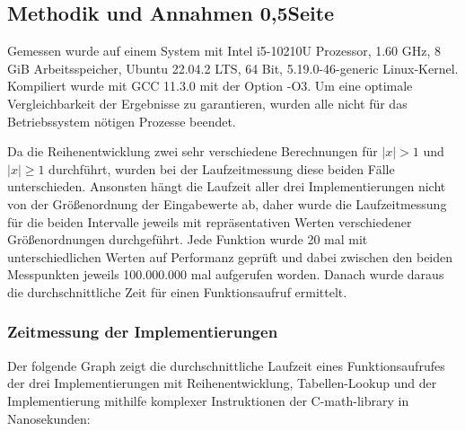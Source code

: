\documentclass[course=erap] {aspdoc}
\begin{document}
     \subsection{Methodik und Annahmen 0,5Seite}
 
     Gemessen wurde auf einem System mit Intel i5-10210U Prozessor, 1.60 GHz, 8 GiB Arbeitsspeicher, Ubuntu 22.04.2 LTS, 64 Bit, 5.19.0-46-generic Linux-Kernel.
     Kompiliert wurde mit GCC 11.3.0 mit der Option -O3. Um eine optimale Vergleichbarkeit der Ergebnisse zu garantieren, wurden alle nicht für das Betriebssystem nötigen Prozesse beendet. 
 
     Da die Reihenentwicklung zwei sehr verschiedene Berechnungen für $|x|>1$ und $|x|\geq 1$ durchführt, wurden bei der Laufzeitmessung diese beiden Fälle unterschieden.
     Ansonsten hängt die Laufzeit aller drei Implementierungen nicht von der Größenordnung der Eingabewerte ab, daher wurde die Laufzeitmessung für die beiden Intervalle jeweils mit repräsentativen Werten verschiedener Größenordnungen durchgeführt.
     Jede Funktion wurde 20 mal mit unterschiedlichen Werten auf Performanz geprüft und dabei zwischen den beiden Messpunkten jeweils 100.000.000 mal aufgerufen worden. Danach wurde daraus die durchschnittliche Zeit für einen Funktionsaufruf ermittelt.
 
     \subsubsection{Zeitmessung der Implementierungen}
 
     Der folgende Graph zeigt die durchschnittliche Laufzeit eines Funktionsaufrufes der drei Implementierungen mit Reihenentwicklung, Tabellen-Lookup und der Implementierung mithilfe komplexer Instruktionen der C-math-library in Nanosekunden:
 
 
\end{document}
